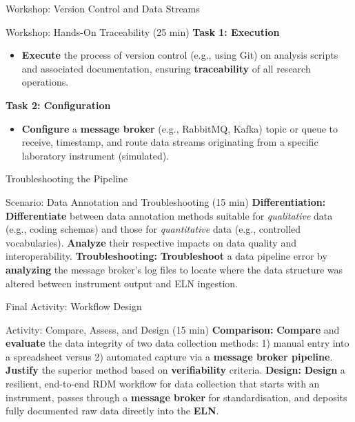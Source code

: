 \documentclass{integrity} %
\begin{document}
\begin{frame}{Workshop: Version Control and Data Streams}
    \begin{block}{Workshop: Hands-On Traceability (25 min)}
        \textbf{Task 1: Execution}
        \begin{itemize}
            \item \textbf{Execute} the process of version control (e.g., using Git) on analysis scripts and associated documentation, ensuring \textbf{traceability} of all research operations.
        \end{itemize}
        \pause
        \textbf{Task 2: Configuration}
        \begin{itemize}
            \item \textbf{Configure} a \textbf{message broker} (e.g., RabbitMQ, Kafka) topic or queue to receive, timestamp, and route data streams originating from a specific laboratory instrument (simulated).
        \end{itemize}
    \end{block}
\end{frame}

\begin{frame}{Troubleshooting the Pipeline}
    \begin{block}{Scenario: Data Annotation and Troubleshooting (15 min)}
        \textbf{Differentiation:} \textbf{Differentiate} between data annotation methods suitable for \emph{qualitative} data (e.g., coding schemas) and those for \emph{quantitative} data (e.g., controlled vocabularies). \textbf{Analyze} their respective impacts on data quality and interoperability.
        \pause
        \textbf{Troubleshooting:} \textbf{Troubleshoot} a data pipeline error by \textbf{analyzing} the message broker's log files to locate where the data structure was altered between instrument output and ELN ingestion.
    \end{block}
\end{frame}

\begin{frame}{Final Activity: Workflow Design}
    \begin{block}{Activity: Compare, Assess, and Design (15 min)}
        \textbf{Comparison:} \textbf{Compare} and \textbf{evaluate} the data integrity of two data collection methods: 1) manual entry into a spreadsheet versus 2) automated capture via a \textbf{message broker pipeline}. \textbf{Justify} the superior method based on \textbf{verifiability} criteria.
        \pause
        \textbf{Design:} \textbf{Design} a resilient, end-to-end RDM workflow for data collection that starts with an instrument, passes through a \textbf{message broker} for standardisation, and deposits fully documented raw data directly into the \textbf{ELN}.
    \end{block}
\end{frame}
\end{document}
